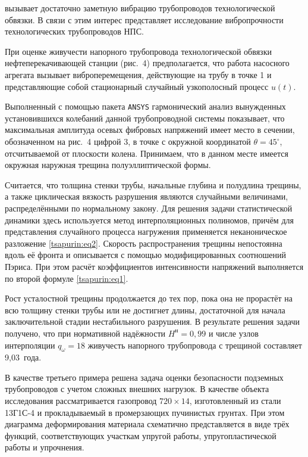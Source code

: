 \noindent вызывает достаточно заметную вибрацию трубопроводов технологической обвязки. В связи с этим интерес представляет исследование вибропрочности технологических трубопроводов НПС.

При оценке живучести напорного трубопровода технологической обвязки нефтеперекачивающей станции (рис.~4) предполагается, что работа насосного агрегата вызывает виброперемещения, действующие
на трубу в точке 1 и представляющие собой стационарный случайный
узкополосный процесс $u(t)$.


Выполненный с помощью пакета {\tt ANSYS} гармонический анализ
вынужденных установившихся колебаний данной трубопроводной системы
показывает, что максимальная амплитуда осевых фибровых напряжений
имеет место в сечении, обозначенном на рис.~4 цифрой 3, в точке с
окружной координатой $\theta =45^\circ $, отсчитываемой от
плоскости колена. Принимаем, что в данном месте имеется окружная
наружная трещина полуэллиптической формы.

Считается, что толщина стенки трубы, начальные глубина и полудлина
трещины, а также циклическая вязкость разрушения являются
случайными величинами, распределёнными по нормальному закону. Для
решения задачи статистической динамики здесь используется метод
интерполяционных полиномов, причём для представления случайного
процесса нагружения применяется неканоническое разложение
\eqref{tsapurin:eq2}. Скорость распространения трещины непостоянна
вдоль её фронта и описывается с помощью модифицированных
соотношений Пэриса. При этом расчёт коэффициентов интенсивности
напряжений выполняется по второй формуле \eqref{tsapurin:eq1}.

Рост усталостной трещины продолжается до тех пор, пока она не
прорастёт на всю толщину стенки трубы или не достигнет длины,
достаточной для начала заключительной стадии нестабильного
разрушения. В результате решения задачи получено, что при
нормативной надёжности $H^\text{н}=0,99$ и числе узлов
интерполяции $q_\omega =18$ живучесть напорного трубопровода с
трещиной составляет 9,03~года.

В качестве третьего примера решена задача оценки безопасности
подземных трубопроводов с учетом сложных внешних нагрузок. В
качестве объекта исследования рассматривается газопровод
$720\times14$, изготовленный из стали 13Г1С-4 и прокладываемый в
промерзающих пучинистых грунтах. При этом диаграмма деформирования
материала схематично представляется в виде трёх функций,
соответствующих участкам упругой работы, упругопластической работы
и упрочнения.

